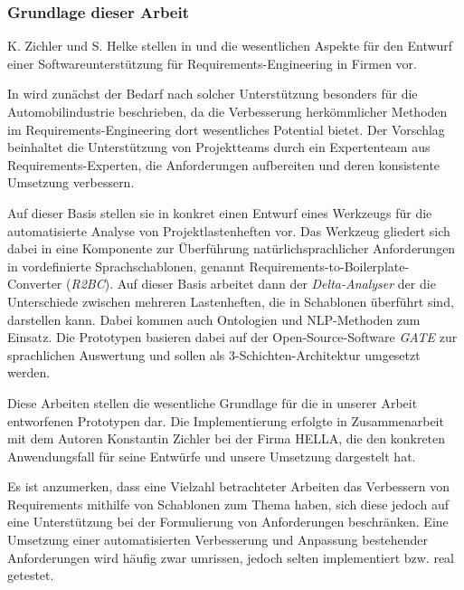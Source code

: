 \documentclass[12pt]{report}
\begin{document}
\subsubsection{Grundlage dieser Arbeit}
K. Zichler und S. Helke stellen in \cite{zh17} und \cite{zh19} die wesentlichen Aspekte für den Entwurf einer Softwareunterstützung für Requirements-Engineering in Firmen vor. 

In \cite{zh17} wird zunächst der Bedarf nach solcher Unterstützung besonders für die Automobilindustrie beschrieben, da die Verbesserung herkömmlicher Methoden im Requirements-Engineering dort wesentliches Potential bietet. Der Vorschlag beinhaltet die Unterstützung von Projektteams durch ein Expertenteam aus Requirements-Experten, die Anforderungen aufbereiten und deren konsistente Umsetzung verbessern. 

Auf dieser Basis stellen sie in \cite{zh19} konkret einen Entwurf eines Werkzeugs für die automatisierte Analyse von Projektlastenheften vor. Das Werkzeug gliedert sich dabei in eine Komponente zur Überführung natürlichsprachlicher Anforderungen in vordefinierte Sprachschablonen, genannt Requirements-to-Boilerplate-Converter (\textit{R2BC}). Auf dieser Basis arbeitet dann der \textit{Delta-Analyser} der die Unterschiede zwischen mehreren Lastenheften, die in Schablonen überführt sind, darstellen kann. Dabei kommen auch Ontologien und NLP-Methoden zum Einsatz. Die Prototypen basieren dabei auf der Open-Source-Software \textit{GATE} zur sprachlichen Auswertung und sollen als 3-Schichten-Architektur umgesetzt werden. 

Diese Arbeiten stellen die wesentliche Grundlage für die in unserer Arbeit entworfenen Prototypen dar. Die Implementierung erfolgte in Zusammenarbeit mit dem Autoren Konstantin Zichler bei der Firma HELLA, die den konkreten Anwendungsfall für seine Entwürfe und unsere Umsetzung dargestelt hat.

\vspace{12pt}

Es ist anzumerken, dass eine Vielzahl betrachteter Arbeiten das Verbessern von Requirements mithilfe von Schablonen zum Thema haben, sich diese jedoch auf eine Unterstützung bei der Formulierung von Anforderungen beschränken. Eine Umsetzung einer automatisierten Verbesserung und Anpassung bestehender Anforderungen wird häufig zwar umrissen, jedoch selten implementiert bzw. real getestet.
\end{document}
